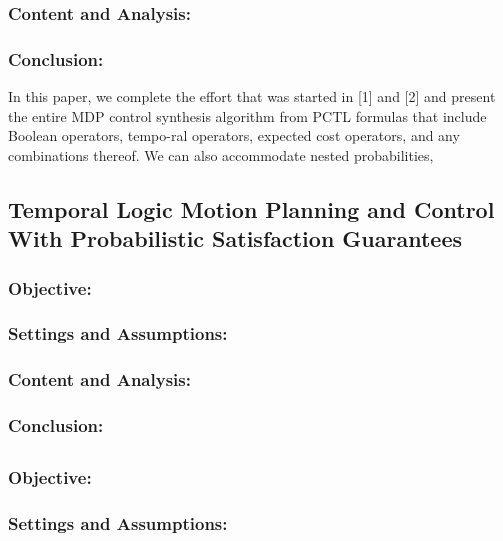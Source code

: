 \documentclass{article}
\theoremstyle{definition}
\begin{document}
\subsubsection{Content and Analysis:}

\subsubsection{Conclusion: } In this paper, we complete the effort that was started in [1]
and [2] and present the entire MDP control synthesis algorithm from PCTL formulas that include Boolean operators, tempo-ral operators, expected cost operators, and any combinations
thereof. We can also accommodate nested probabilities,

\subsection{Temporal Logic Motion Planning and Control With Probabilistic Satisfaction Guarantees}
\subsubsection{Objective:}

\subsubsection{Settings and Assumptions:}

\subsubsection{Content and Analysis:}

\subsubsection{Conclusion:}

\subsection{}
\subsubsection{Objective:}

\subsubsection{Settings and Assumptions:}
\end{document}
